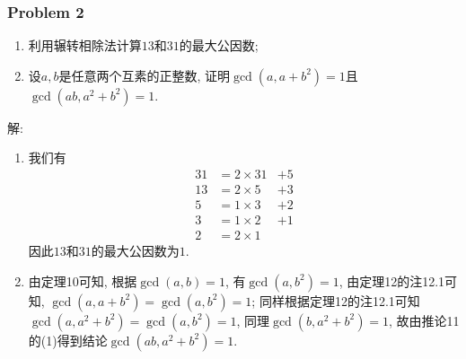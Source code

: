 \documentclass[a4paper,12pt]{ctexart}
\begin{document}
\subsubsection*{Problem 2} 
    \begin{enumerate}[label=(\arabic{*})]
        \item 利用辗转相除法计算$13$和$31$的最大公因数;
        \item 设$a,b$是任意两个互素的正整数, 证明$\gcd(a,a+b^2)=1$且$\gcd(ab,a^2+b^2)=1$.
    \end{enumerate}
    解: 
         \begin{enumerate}[label=(\arabic{*})]
            \item 我们有 \begin{align*}
                31&=2\times 31&+5\\
                13&=2\times 5 &+3\\
                 5&=1\times 3 &+2\\
                 3&=1\times 2 &+1\\
                 2&=2\times 1&
            \end{align*}
            因此$13$和$31$的最大公因数为$1$.
            \item 由定理10可知, 根据$\gcd(a,b)=1$, 有$\gcd(a,b^2)=1$, 由定理12的注12.1可知, $\gcd(a,a+b^2)=\gcd(a,b^2)=1$; 同样根据定理12的注12.1可知$\gcd(a,a^2+b^2)=\gcd(a,b^2)=1$, 同理$\gcd(b,a^2+b^2)=1$, 故由推论11的(1)得到结论$\gcd(ab,a^2+b^2)=1$.
        \end{enumerate}
\end{document}
